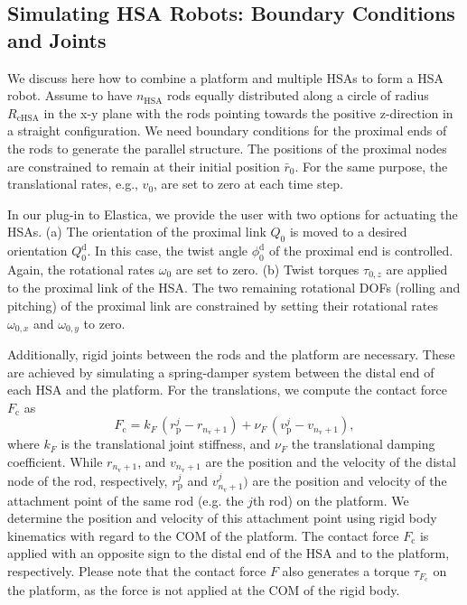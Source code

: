 \subsection{Simulating HSA Robots: Boundary Conditions and Joints}\label{sub:hsamodel:hsa_robot_simulation:hsa_robots}
%
We discuss here how to combine a platform and multiple \glspl{HSA} to form a \gls{HSA} robot.  Assume to have $n_\mathrm{HSA}$ rods equally distributed along a circle of radius $R_\mathrm{cHSA}$ in the x-y plane with the rods pointing towards the positive z-direction in a straight configuration.
%
We need boundary conditions for the proximal ends of the rods to generate the parallel structure. The positions of the proximal nodes are constrained to remain at their initial position $\bar{r}_{0}$.
For the same purpose, the translational rates, e.g., $v_0$, are set to zero at each time step. 

In our plug-in to Elastica, we provide the user with two options for actuating the \glspl{HSA}. (a) The orientation of the proximal link $Q_{0}$ is moved to a desired orientation $Q_{0}^\mathrm{d}$. In this case, the twist angle $\phi_0^\mathrm{d}$ of the proximal end is controlled. Again, the rotational rates $\omega_0$ are set to zero. 
(b) Twist torques $\tau_{0,z}$ are applied to the proximal link of the \gls{HSA}. The two remaining rotational \glspl{DOF} (rolling and pitching) of the proximal link are constrained by setting their rotational rates $\omega_{0,x}$ and $\omega_{0,y}$ to zero.

Additionally, rigid joints between the rods and the platform are necessary. These are achieved by simulating a spring-damper system between the distal end of each \gls{HSA} and the platform. For the translations, we compute the contact force $F_\mathrm{c}$ as 
\begin{equation}
    F_\mathrm{c} = k_F \, (r_\mathrm{p}^j - r_{n_\mathrm{v}+1}) + \nu_F \, (v_\mathrm{p}^j - v_{n_\mathrm{v}+1}),
\end{equation}
where $k_F$ is the translational joint stiffness, and $\nu_F$ the translational damping coefficient. While $r_{n_\mathrm{v}+1}$, and $v_{n_\mathrm{v}+1}$ are the position and the velocity of the distal node of the rod, respectively, $r_\mathrm{p}^j$ and $v_{n_\mathrm{v}+1}^j)$ are the position and velocity of the attachment point of the same rod (e.g. the $j$th rod) on the platform. We determine the position and velocity of this attachment point using rigid body kinematics with regard to the \gls{COM} of the platform. The contact force $F_\mathrm{c}$ is applied with an opposite sign to the distal end of the \gls{HSA} and to the platform, respectively. Please note that the contact force $F$ also generates a torque $\tau_{F_\mathrm{c}}$ on the platform, as the force is not applied at the \gls{COM} of the rigid body.

